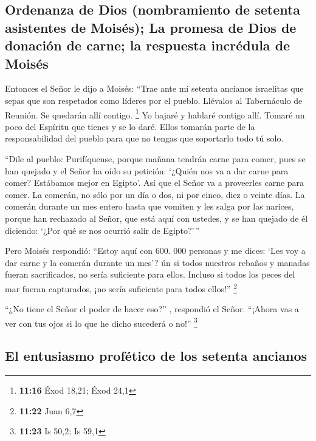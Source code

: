 \hypertarget{ordenanza-de-dios-nombramiento-de-setenta-asistentes-de-moisuxe9s-la-promesa-de-dios-de-donaciuxf3n-de-carne-la-respuesta-incruxe9dula-de-moisuxe9s}{%
\subsection{Ordenanza de Dios (nombramiento de setenta asistentes de
Moisés); La promesa de Dios de donación de carne; la respuesta incrédula
de
Moisés}\label{ordenanza-de-dios-nombramiento-de-setenta-asistentes-de-moisuxe9s-la-promesa-de-dios-de-donaciuxf3n-de-carne-la-respuesta-incruxe9dula-de-moisuxe9s}}

 Entonces el Señor le dijo a Moisés: ``Trae ante mí
setenta ancianos israelitas que sepas que son respetados como líderes
por el pueblo. Llévalos al Tabernáculo de Reunión. Se quedarán allí
contigo. \footnote{\textbf{11:16} Éxod 18,21; Éxod 24,1} 
Yo bajaré y hablaré contigo allí. Tomaré un poco del Espíritu que tienes
y se lo daré. Ellos tomarán parte de la responsabilidad del pueblo para
que no tengas que soportarlo todo tú solo.

 ``Dile al pueblo: Purifíquense, porque mañana tendrán
carne para comer, pues se han quejado y el Señor ha oído su petición:
`¿Quién nos va a dar carne para comer? Estábamos mejor en Egipto'. Así
que el Señor va a proveerles carne para comer.  La
comerán, no sólo por un día o dos, ni por cinco, diez o veinte días.
 La comerán durante un mes entero hasta que vomiten y les
salga por las narices, porque han rechazado al Señor, que está aquí con
ustedes, y se han quejado de él diciendo: `¿Por qué se nos ocurrió salir
de Egipto?'\,''

 Pero Moisés respondió: ``Estoy aquí con 600. 000
personas y me dices: `Les voy a dar carne y la comerán durante un mes'?
 ún si todos nuestros rebaños y manadas fueran
sacrificados, no sería suficiente para ellos. Incluso si todos los peces
del mar fueran capturados, ¡no sería suficiente para todos ellos!''
\footnote{\textbf{11:22} Juan 6,7}

 ``¿No tiene el Señor el poder de hacer eso?'' ,
respondió el Señor. ``¡Ahora vas a ver con tus ojos si lo que he dicho
sucederá o no!'' \footnote{\textbf{11:23} Is 50,2; Is 59,1}

\hypertarget{el-entusiasmo-profuxe9tico-de-los-setenta-ancianos}{%
\subsection{El entusiasmo profético de los setenta
ancianos}\label{el-entusiasmo-profuxe9tico-de-los-setenta-ancianos}}

